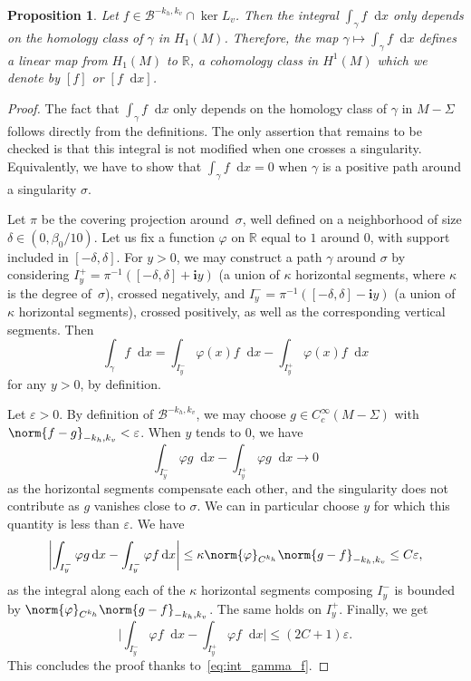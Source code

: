 \documentclass[JEP,XML,SOM,Unicode]{cedram}
\newcommand{\boB}{\mathcal{B}}
\newcommand{\R}{\mathbb{R}}
\newcommand{\dd}{\mathop{}\!\mathrm{d}}
\newcommand{\ic}{\mathbf{i}}
\newcommand{\absgg}[1]{\biggl \lvert#1\biggr\rvert}
\let\epsilon\varepsilon
\let\phi\varphi
\newtheorem{prop}[thm]{Proposition}
\theoremstyle{definition}
\numberwithin{equation}{section}
\begin{document}
\begin{prop}
\label{prop:define_H1} Let $f \in \boB^{-k_h, k_v} \cap \ker L_v$. Then the
integral $\int_\gamma f \dd x$ only depends on the homology class of $\gamma$
in $H_1(M)$. Therefore, the map $\gamma \mapsto \int_\gamma f\dd x$ defines a
linear map from $H_1(M)$ to $\R$, \ie a cohomology class in $H^1(M)$ which
we denote by $[f]$ or $[f\dd x]$.
\end{prop}
\begin{proof}
The fact that $\int_\gamma f \dd x$ only depends on the homology class of
$\gamma$ in $M-\Sigma$ follows directly from the definitions. The only
assertion that remains to be checked is that this integral is not modified
when one crosses a singularity. Equivalently, we have to show that
$\int_\gamma f \dd x = 0$ when $\gamma$ is a positive path around a
singularity $\sigma$.

Let $\pi$ be the covering projection around~$\sigma$, well defined on a
neighborhood of size $\delta \in (0, \beta_0/10)$. Let us fix a function
$\phi$ on $\R$ equal to $1$ around $0$, with support included in
$[-\delta,\delta]$. For $y>0$, we may construct a path $\gamma$ around
$\sigma$ by considering $I_y^+ = \pi^{-1}([-\delta, \delta] + \ic y)$ (a
union of $\kappa$ horizontal segments, where $\kappa$ is the degree of~$\sigma$), crossed negatively, and $I_y^- = \pi^{-1}([-\delta, \delta] - \ic
y)$ (a union of $\kappa$ horizontal segments), crossed positively, as well as
the corresponding vertical segments. Then
\begin{equation}
\label{eq:int_gamma_f}
\int_\gamma f \dd x
= \int_{I_y^-} \phi(x) f \dd x - \int_{I_y^+} \phi(x) f \dd x
\end{equation}
for any $y>0$, by definition.

Let $\epsilon>0$. By definition of $\boB^{-k_h, k_v}$, we may choose $g \in
C_c^\infty(M-\Sigma)$ with \hbox{$\norm{f-g}_{-k_h, k_v} < \epsilon$}. When $y$
tends to $0$, we have
\[
\int_{I_y^-} \phi g \dd x - \int_{I_y^+} \phi g \dd x
\to 0
\]
as the horizontal segments compensate each other, and the singularity
does not contribute as $g$ vanishes close to $\sigma$. We can in particular
choose $y$ for which this quantity is less than $\epsilon$. We have
\begin{equation*}
\absgg{\int_{I_y^-} \phi g \dd x - \int_{I_y^-} \phi f \dd x} \leq \kappa \norm{\phi}_{C^{k_h}} \norm{g - f}_{-k_h, k_v}
\leq C \epsilon,
\end{equation*}
as the integral along each of the $\kappa$ horizontal segments composing
$I_y^-$ is bounded by $\norm{\phi}_{C^{k_h}} \norm{g - f}_{-k_h, k_v}$. The
same holds on $I_y^+$. Finally, we get
\[
\absgg{\int_{I_y^-} \phi f \dd x -
\int_{I_y^+} \phi f \dd x} \leq (2C+1)\epsilon.
\]
This concludes the proof
thanks to~\eqref{eq:int_gamma_f}.
\end{proof}
\end{document}
